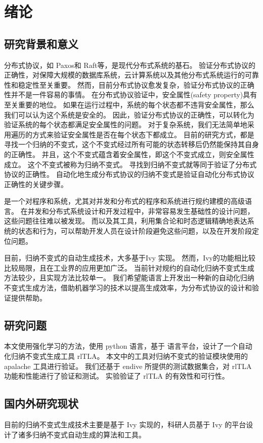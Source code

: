 \chapter{绪论}

\section{研究背景和意义}
分布式协议，如 Paxos和 Raft等，是现代分布式系统的基石。
验证分布式协议的正确性，对保障大规模的数据库系统，云计算系统以及其他分布式系统运行的可靠性和稳定性至关重要。
然而，目前分布式协议愈发复杂，验证分布式协议的正确性并不是一件容易的事情。
在分布式协议验证中，安全属性(safety property)具有至关重要的地位。
如果在运行过程中，系统的每个状态都不违背安全属性，那么我们可以认为这个系统是安全的。
因此，验证分布式协议的正确性，可以转化为验证系统的每个状态都满足安全属性的问题。
对于复杂系统，我们无法简单地采用遍历的方式来验证安全属性是否在每个状态下都成立。
目前的研究方式，都是寻找一个归纳的不变式，这个不变式经过所有可能的状态转移后仍然能保持其自身的正确性。
并且，这个不变式蕴含着安全属性，即这个不变式成立，则安全属性成立。
这个不变式被称为归纳不变式。
寻找到归纳不变式就等同于验证了分布式协议的正确性。\cite{towards}
自动化地生成分布式协议的归纳不变式是验证自动化分布式协议正确性的关键步骤。

\TLA \cite{TLA+}是一个对程序和系统，尤其对并发和分布式的程序和系统进行规约建模的高级语言。
在并发和分布式系统设计和开发过程中，非常容易发生基础性的设计问题，这些问题往往难以被发现。
而\TLA 以及其工具，利用集合论和时态逻辑精确地表达系统的状态和行为，可以帮助开发人员在设计阶段避免这些问题，以及在开发阶段定位问题。

目前，归纳不变式的自动生成技术，大多基于Ivy \cite{Ivy} 实现。
然而，Ivy的功能相比较\TLA 比较局限，且\TLA 在工业界的应用更加广泛。
当前针对\TLA 规约的自动化归纳不变式生成方法较少，且实现方法比较单一。
我们希望能\TLA 语言上开发出一种新的自动化归纳不变式生成方法，借助机器学习的技术以提高生成效率，为分布式协议的设计和验证提供帮助。

\section{研究问题}
本文使用强化学习的方法，使用 python 语言，基于 \TLA 语言平台，设计了一个自动化归纳不变式生成工具 rlTLA。
本文中的工具对归纳不变式的验证模块使用的 apalache 工具进行验证。
我们还基于 endive 所提供的测试数据集合，对 rlTLA 功能和性能进行了验证和测试。
实验验证了 rlTLA 的有效性和可行性。

\section{国内外研究现状}
目前的归纳不变式生成技术主要是基于 Ivy \cite{Ivy} 实现的，科研人员基于 Ivy 的平台设计了诸多归纳不变式自动生成的算法和工具。

